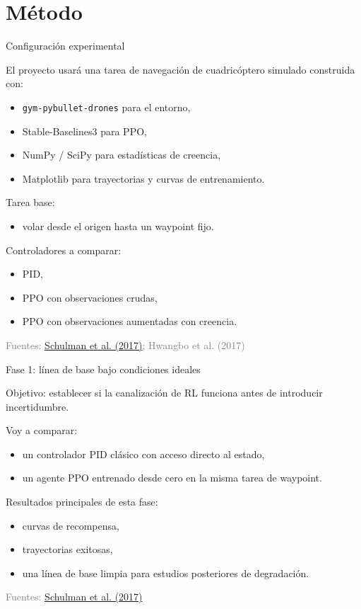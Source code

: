 \documentclass[11pt]{beamer}
\newcommand{\srcSchulman}{\href{https://arxiv.org/abs/1707.06347}{Schulman et al. (2017)}}
\newcommand{\srcHwangbo}{Hwangbo et al. (2017)}
\newcommand{\SourceLine}[1]{\vfill{\tiny\textcolor{gray}{Fuentes: #1}}}
\begin{document}

\section{Método}


\begin{frame}{Configuración experimental}

El proyecto usará una tarea de navegación de cuadricóptero simulado construida con:
\begin{itemize}
  \item \texttt{gym-pybullet-drones} para el entorno,
  \item Stable-Baselines3 para PPO,
  \item NumPy / SciPy para estadísticas de creencia,
  \item Matplotlib para trayectorias y curvas de entrenamiento.
\end{itemize}

\medskip
Tarea base:
\begin{itemize}
  \item volar desde el origen hasta un waypoint fijo.
\end{itemize}

Controladores a comparar:
\begin{itemize}
  \item PID,
  \item PPO con observaciones crudas,
  \item PPO con observaciones aumentadas con creencia.
\end{itemize}

\SourceLine{\srcSchulman; \srcHwangbo}
\end{frame}


\begin{frame}{Fase 1: línea de base bajo condiciones ideales}

Objetivo: establecer si la canalización de RL funciona antes de introducir incertidumbre.

\medskip
Voy a comparar:
\begin{itemize}
  \item un controlador PID clásico con acceso directo al estado,
  \item un agente PPO entrenado desde cero en la misma tarea de waypoint.
\end{itemize}

Resultados principales de esta fase:
\begin{itemize}
  \item curvas de recompensa,
  \item trayectorias exitosas,
  \item una línea de base limpia para estudios posteriores de degradación.
\end{itemize}

\SourceLine{\srcSchulman}
\end{frame}
\end{document}
